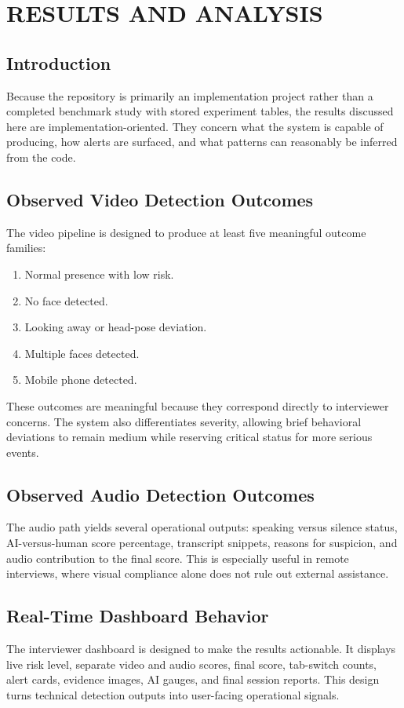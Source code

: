 \documentclass[12pt,a4paper]{extreport}
\begin{document}
\chapter{RESULTS AND ANALYSIS}
\section{Introduction}
Because the repository is primarily an implementation project rather than a completed benchmark study with stored experiment tables, the results discussed here are implementation-oriented. They concern what the system is capable of producing, how alerts are surfaced, and what patterns can reasonably be inferred from the code.

\section{Observed Video Detection Outcomes}
The video pipeline is designed to produce at least five meaningful outcome families:
\begin{enumerate}
  \item Normal presence with low risk.
  \item No face detected.
  \item Looking away or head-pose deviation.
  \item Multiple faces detected.
  \item Mobile phone detected.
\end{enumerate}

These outcomes are meaningful because they correspond directly to interviewer concerns. The system also differentiates severity, allowing brief behavioral deviations to remain medium while reserving critical status for more serious events.

\section{Observed Audio Detection Outcomes}
The audio path yields several operational outputs: speaking versus silence status, AI-versus-human score percentage, transcript snippets, reasons for suspicion, and audio contribution to the final score. This is especially useful in remote interviews, where visual compliance alone does not rule out external assistance.

\section{Real-Time Dashboard Behavior}
The interviewer dashboard is designed to make the results actionable. It displays live risk level, separate video and audio scores, final score, tab-switch counts, alert cards, evidence images, AI gauges, and final session reports. This design turns technical detection outputs into user-facing operational signals.
\end{document}
